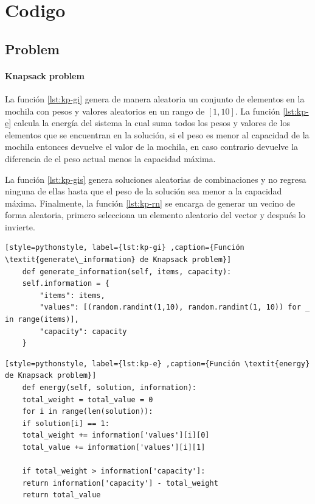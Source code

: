 \chapter{Codigo}

\section{Problem}


\subsubsection{Knapsack problem}

La función \ref{lst:kp-gi} genera de manera aleatoria un conjunto de elementos en la mochila con pesos y valores aleatorios en un rango de $[1,10]$. La función \ref{lst:kp-e} calcula la energía del sistema la cual suma todos los pesos y valores de los elementos que se encuentran en la solución, si el peso es menor al capacidad de la mochila entonces devuelve el valor de la mochila, en caso contrario devuelve la diferencia de el peso actual menos la capacidad máxima.

La función \ref{lst:kp-gis} genera soluciones aleatorias de combinaciones y no regresa ninguna de ellas hasta que el peso de la solución sea menor a la capacidad máxima. Finalmente, la función \ref{lst:kp-rn} se encarga de generar un vecino de forma aleatoria, primero selecciona un elemento aleatorio del vector y después lo invierte.  

\begin{lstlisting}[style=pythonstyle, label={lst:kp-gi} ,caption={Función \textit{generate\_information} de Knapsack problem}]
	def generate_information(self, items, capacity):
	self.information = {
		"items": items,
		"values": [(random.randint(1,10), random.randint(1, 10)) for _ in range(items)],
		"capacity": capacity
	}
\end{lstlisting}

\begin{lstlisting}[style=pythonstyle, label={lst:kp-e} ,caption={Función \textit{energy} de Knapsack problem}]
	def energy(self, solution, information):
	total_weight = total_value = 0
	for i in range(len(solution)):
	if solution[i] == 1:
	total_weight += information['values'][i][0]
	total_value += information['values'][i][1]
	
	if total_weight > information['capacity']:
	return information['capacity'] - total_weight
	return total_value
\end{lstlisting}


